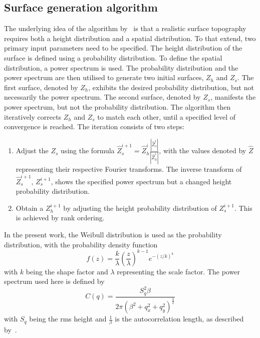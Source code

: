 \subsection{Surface generation algorithm}\label{subsec: Surface generation algorithm}

The underlying idea of  the algorithm by~\cite{perez-rafolsGeneratingRandomlyRough2019} is that a realistic surface topography requires both a height distribution and a spatial distribution.
To that extend, two primary input parameters need to be specified.
The height distribution of the surface is defined using a probability distribution.
To define the spatial distribution, a power spectrum is used.
The probability distribution and the power spectrum are then utilised to  generate two initial surfaces, $Z_h$ and $Z_s$.
The first surface, denoted by $Z_h$, exhibits the desired probability distribution, but not necessarily the power spectrum.
The second surface, denoted by $Z_s$, manifests the power spectrum, but not the probability distribution.
The algorithm then iteratively corrects $Z_h$ and $Z_s$ to match each other, until a specified level of convergence is reached.
The iteration consists of two steps:
\begin{enumerate}
    \item Adjust the $Z_s$ using the formula $\hat{Z}_s^{i+1} = \hat{Z}_h^i \frac{|\hat{Z}_s^i|}{|\hat{Z}_h^i|}$, with the values denoted by $\hat{Z}$ representing their respective Fourier transforms.
    The inverse transform of $\hat{Z}_s^{i+1}$, $Z_s^{i+1}$, shows the specified power spectrum but a changed height probability distribution.
    \item Obtain a $Z_h^{i+1}$ by adjusting the height probability distribution of $Z_s^{i+1}$.
    This is achieved by rank ordering.
\end{enumerate}
In the present work, the Weibull distribution is used as the probability distribution, with the probability density function
\begin{equation}\label{eq: Weibull distribution}
    f(z) = \frac{k}{\lambda} \left(\frac{z}{\lambda}\right)^{k-1} e^{-(z/k)^{k}}
\end{equation}
with $k$ being the shape factor and $\lambda$ representing the scale factor.
The power spectrum used here is defined by
\begin{equation}\label{eq: Power spectrum}
    C(q) = \frac{S_q^2 \beta}{2\pi\left(\beta^2 + q_x^2+q_y^2\right)^{\frac{3}{2}}}
\end{equation}
with $S_q$ being the rms height and $\frac{1}{\beta}$ is the autocorrelation length, as described by~\cite{perez-rafolsGeneratingRandomlyRough2019}.

